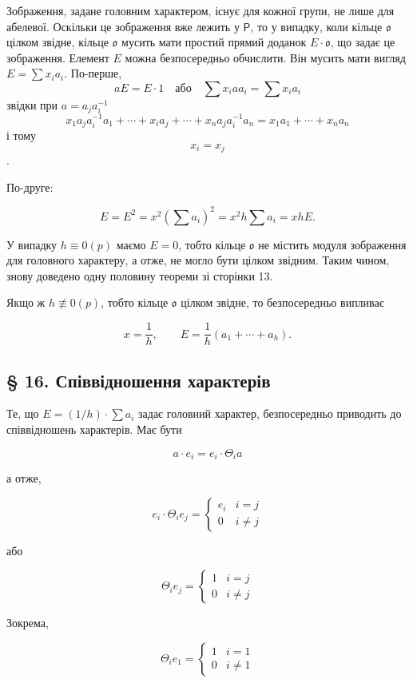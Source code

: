 \documentclass[11pt]{article}
\begin{document}
Зображення, задане головним характером, існує для кожної групи, не лише для абелевої. Оскільки це зображення вже лежить у \(\mathsf P\), то у випадку, коли кільце \(\mathfrak o\) цілком звідне, кільце \(\mathfrak o\) мусить мати простий прямий доданок \(E\cdot\mathfrak o\), що задає це зображення. Елемент \(E\) можна безпосередньо обчислити. Він мусить мати вигляд \(E=\sum x_i a_i\). По-перше,
\[
aE=E\cdot 1\quad\text{або}\quad \sum x_i a a_i=\sum x_i a_i
\]
звідки при \(a=a_j a_i^{-1}\)
\[
x_1a_ja_i^{-1}a_1+\cdots+x_i a_j+\cdots+x_na_ja_i^{-1}a_n
=x_1a_1+\cdots+x_na_n
\]
і тому
\[
x_i=x_j
\]
.

По-друге:

\[
E=E^2=x^2\left(\sum a_i\right)^2=x^2h\sum a_i=xhE.
\]

У випадку \(h\equiv0(p)\) маємо \(E=0\), тобто кільце \(\mathfrak o\) не містить модуля зображення для головного характеру, а отже, не могло бути цілком звідним. Таким чином, знову доведено одну половину теореми зі сторінки 13.

Якщо ж \(h\not\equiv0(p)\), тобто кільце \(\mathfrak o\) цілком звідне, то безпосередньо випливає

\[
x=\frac{1}{h},\qquad E=\frac{1}{h}(a_1+\cdots+a_h).
\]

\subsection*{§ 16. Співвідношення характерів}\label{die-charakterenrelationen}

Те, що \(E=(1/h)\cdot\sum a_i\) задає головний характер, безпосередньо приводить до співвідношень характерів. Має бути

\[a \cdot e_i = e_i \cdot \Theta_i a\]

а отже,

\[e_i \cdot \Theta_i e_j = \begin{cases} e_i & i = j \\ 0 & i \neq j \end{cases}\]

або

\[\Theta_i e_j = \begin{cases} 1 & i = j \\ 0 & i \neq j \end{cases}\]

Зокрема,

\[\Theta_i e_1 = \begin{cases} 1 & i = 1 \\ 0 & i \neq 1 \end{cases}\]
\end{document}
